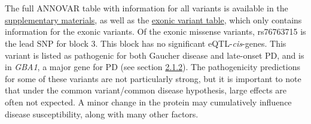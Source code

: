 \documentclass{article}
\begin{document}
\\
\\The full ANNOVAR table with information for all variants is available in the \href{https://github.com/Thomas-brightwell/PD-MSc-project-code/blob/main/Thesis/Supplementary%20materials/HighLDvariants.avinput.variant_function}{supplementary materials}, as well as the \href{https://github.com/Thomas-brightwell/PD-MSc-project-code/blob/main/Thesis/Supplementary%20materials/HighLDvariants.avinput.exonic_variant_function}{exonic variant table}, which only contains information for the exonic variants. Of the exonic missense variants, rs76763715 is the lead SNP for block 3. This block has no significant eQTL-\textit{cis}-genes. This variant is listed as pathogenic for both Gaucher disease and late-onset PD, and is in \textit{GBA1}, a major gene for PD (see section \hyperref[subsubsec:PDtypes]{2.1.2}). The pathogenicity predictions for some of these variants are not particularly strong, but it is important to note that under the common variant/common disease hypothesis, large effects are often not expected. A minor change in the protein may cumulatively influence disease susceptibility, along with many other factors.
\end{document}
